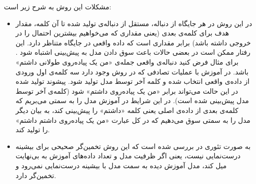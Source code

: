 \newline
مشکلات این روش به شرح زیر است:
\begin{itemize}
	\item 
در این روش در هر جایگاه از دنباله، مستقل از دنباله‌ی تولید شده تا آن کلمه، مقدار هدف برای کلمه‌ی بعدی  (یعنی مقداری که می‌خواهیم بیشترین احتمال را در خروجی داشته باشد) برابر مقداری است که داده واقعی در جایگاه متناظر دارد. این رفتار ممکن است در بعضی حالات باعث سوق دادن مدل به پیش‌بینی اشتباه شود
	 \cite{ranzato2015sequence}.
	 \newline
	 برای مثال فرض کنید دنباله‌ی واقعی جمله‌ی «من یک پیاده‌روی طولانی داشتم» باشد. 
	 در آموزش با عملیات تصادفی که در روش وجود دارد سه کلمه‌ی اول ورودی از داده‌ی واقعی انتخاب شده و کلمه آخر توسط مدل تولید شود. پیشوند تولید شده در این حالت  می‌تواند برابر «من یک پیاده‌روی داشتم» شود (کلمه‌ی آخر توسط مدل پیش‌بینی شده است). در این شرایط در آموزش مدل را به سمتی می‌بریم که کلمه‌ی بعدی از داده‌ی اصلی یعنی کلمه «داشتم» را پیش‌بینی کند، به بیان دیگر مدل را به سمتی سوق می‌دهیم که در کل عبارت «من یک پیاده‌روی داشتم داشتم» را تولید کند.
	 \item
به صورت تئوری در
	  \cite{Huszar15HowNot}
	  بررسی شده است که این روش تخمین‌گر صحیحی برای بیشینه درست‌نمایی نیست، یعنی اگر ظرفیت مدل و تعداد داده‌های آموزش به بی‌نهایت میل کند، مدل آموزش دیده به سمت مدل با بیشینه درست‌نمایی نمی‌رود و تخمین‌گر
دارد.
\end{itemize}
 
